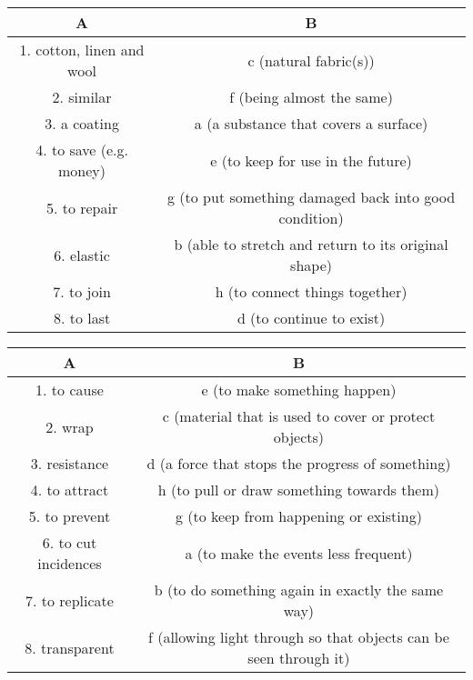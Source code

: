 \begin{center}
      \begin{tabular}{|c|c|}
            \hline
            \textbf{A}                & \textbf{B}                                            \\
            \hline
            1. cotton, linen and wool & c (natural fabric(s))                                 \\
            2. similar                & f (being almost the same)                             \\
            3. a coating              & a (a substance that covers a surface)                 \\
            4. to save (e.g. money)   & e (to keep for use in the future)                     \\
            5. to repair              & g (to put something damaged back into good condition) \\
            6. elastic                & b (able to stretch and return to its original shape)  \\
            7. to join                & h (to connect things together)                        \\
            8. to last                & d (to continue to exist)                              \\
            \hline
      \end{tabular}
\end{center}

\begin{center}
      \begin{tabular}{|c|c|}
            \hline
            \textbf{A}           & \textbf{B}                                                        \\
            \hline
            1. to cause          & e (to make something happen)                                      \\
            2. wrap              & c (material that is used to cover or protect objects)             \\
            3. resistance        & d (a force that stops the progress of something)                  \\
            4. to attract        & h (to pull or draw something towards them)                        \\
            5. to prevent        & g (to keep from happening or existing)                            \\
            6. to cut incidences & a (to make the events less frequent)                              \\
            7. to replicate      & b (to do something again in exactly the same way)                 \\
            8. transparent       & f (allowing light through so that objects can be seen through it) \\
            \hline
      \end{tabular}
\end{center}

